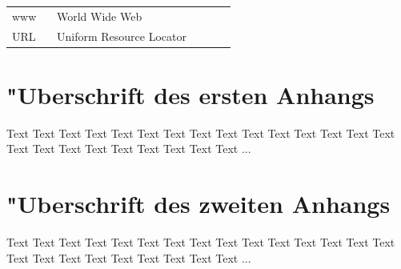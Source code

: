 \documentclass[a4paper,bibtotoc,oneside]{scrbook}
\begin{document}
\listoffigures
{} %
\newpage

\listoftables 
{} %
\newpage

\hspace{-17mm}\begin{tabular}{>{\raggedleft}p{0.2\linewidth} p{0.75\linewidth} p{0.1\linewidth}}
www & World Wide Web \\
URL & Uniform Resource Locator
\end{tabular}


\begin{appendix}
\chapter[Erster Anhang]{"Uberschrift des ersten Anhangs}

Text Text Text Text Text Text Text Text Text Text Text Text Text Text Text Text Text Text Text Text Text Text Text Text ...
 

\chapter[Zweiter Anhang]{"Uberschrift des zweiten Anhangs}

Text Text Text Text Text Text Text Text Text Text Text Text Text Text Text Text Text Text Text Text Text Text Text Text ...

\end{appendix}
\end{document}
